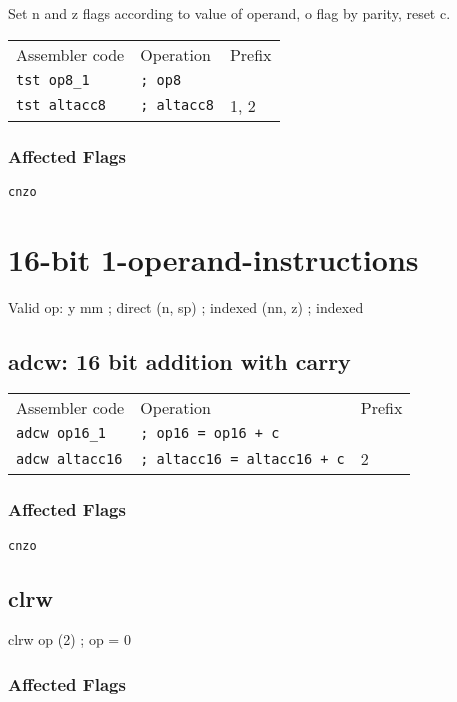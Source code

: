 \documentclass{book}
\begin{document}
Set n and z flags according to value of operand, o flag by parity, reset c.

\begin{tabular}{l l l}
Assembler code       & Operation          & Prefix \\
\texttt{tst op8\_1}  & \texttt{; op8}     & \\
\texttt{tst altacc8} & \texttt{; altacc8} & 1, 2
\end{tabular}

\subsubsection*{Affected Flags}

\texttt{cnzo}


\section{16-bit 1-operand-instructions}

Valid op:
y
mm      ; direct
(n, sp) ; indexed
(nn, z) ; indexed

\subsection{adcw: 16 bit addition with carry}

\begin{tabular}{l l l}
Assembler code         & Operation                          & Prefix \\
\texttt{adcw op16\_1}  & \texttt{; op16 = op16 + c}         & \\
\texttt{adcw altacc16} & \texttt{; altacc16 = altacc16 + c} & 2
\end{tabular}

\subsubsection*{Affected Flags}

\texttt{cnzo}


\subsection{clrw}

clrw op (2)        ; op = 0

\subsubsection*{Affected Flags}
\end{document}
